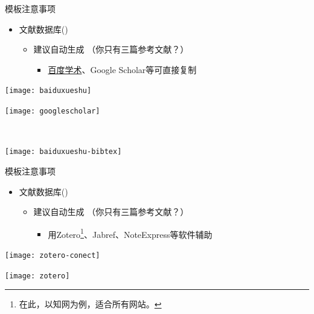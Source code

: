 \documentclass[fontset = none, xcolor=svgnames, t, aspectratio=169]{ctexbeamer}
\begin{document}
\begin{frame}{\nwafuthesis 模板}{注意事项}
  \stretchon
  \begin{itemize}
  \item 文献数据库()
    \begin{itemize}
    \item 建议自动生成 （你只有三篇参考文献？）
      \begin{itemize}
      \item \href{http://xueshu.baidu.com/}{百度学术}、Google Scholar等可直接复制
      \end{itemize}
      
    \end{itemize}
  \end{itemize}
  \centering
  \begin{annotatedFigure}
    {\texttt{[image: baiduxueshu]}}
  \end{annotatedFigure}\quad
  \begin{annotatedFigure}
    {\texttt{[image: googlescholar]}}
  \end{annotatedFigure}\\[2ex]
  \begin{annotatedFigure}
    {\texttt{[image: baiduxueshu-bibtex]}}
  \end{annotatedFigure}
  \stretchoff
\end{frame}

\begin{frame}{\nwafuthesis 模板}{注意事项}
  \begin{itemize}
  \item 文献数据库()
    \begin{itemize}
    \item 建议自动生成 （你只有三篇参考文献？）

      \begin{itemize}
      \item 用Zotero\footnote[frame,1]{在此，以知网为例，适合所有网站。}、Jabref、NoteExpress等软件辅助
      \end{itemize}
      
    \end{itemize}
  \end{itemize}
  \centering
  \vspace{6ex}
  \begin{annotatedFigure}
    {\texttt{[image: zotero-conect]}}
  \end{annotatedFigure}\quad%
  \begin{annotatedFigure}
    {\texttt{[image: zotero]}}
  \end{annotatedFigure}
\end{frame}
\end{document}
